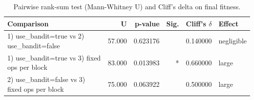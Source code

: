\begin{table}[htbp]
\centering
\caption{Pairwise rank-sum test (Mann-Whitney U) and Cliff's delta on final fitness.}
\label{tab:wilcoxon_ranksum_cliffs}
\begin{tabular}{lrrrrl}
\toprule
Comparison & U & p-value & Sig. & Cliff's $\delta$ & Effect \\
\midrule
1) use_bandit=true vs 2) use_bandit=false & 57.000 & 0.623176 &  & 0.140000 & negligible \\
1) use_bandit=true vs 3) fixed ops per block & 83.000 & 0.013983 & * & 0.660000 & large \\
2) use_bandit=false vs 3) fixed ops per block & 75.000 & 0.063922 &  & 0.500000 & large \\
\bottomrule
\end{tabular}
\end{table}
